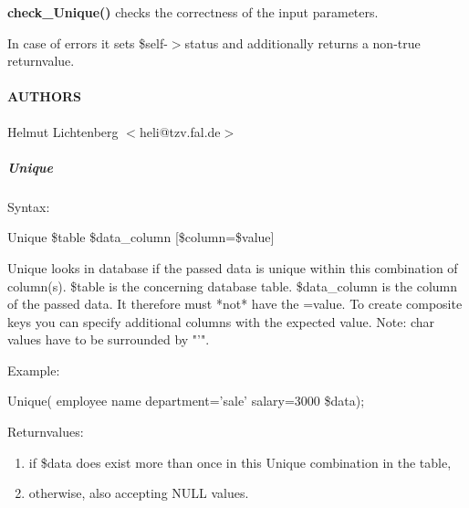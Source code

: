 \textbf{check\_Unique()} checks the correctness of the input parameters.



In case of errors it sets \$self-$>$status and additionally returns a non-true
returnvalue.

\paragraph*{AUTHORS\label{Unique_AUTHORS}}


Helmut Lichtenberg $<$heli@tzv.fal.de$>$

\subparagraph*{Unique\label{Unique_Unique}}


Syntax:



Unique \$table \$data\_column [\$column=\$value]



Unique looks in database if the passed data is unique within this combination
of column(s).
\$table is the concerning database table.
\$data\_column is the column of the passed data. It therefore must *not* have
the =value.
To create composite keys you can specify additional columns
with the expected value. Note: char values have to be surrounded by "'".



Example:



Unique( employee name department='sale' salary=3000 \$data);



Returnvalues:

\begin{enumerate}

\item 

if \$data does exist more than once in this Unique combination in the table,


\item 

otherwise, also accepting NULL values.

\end{enumerate}
